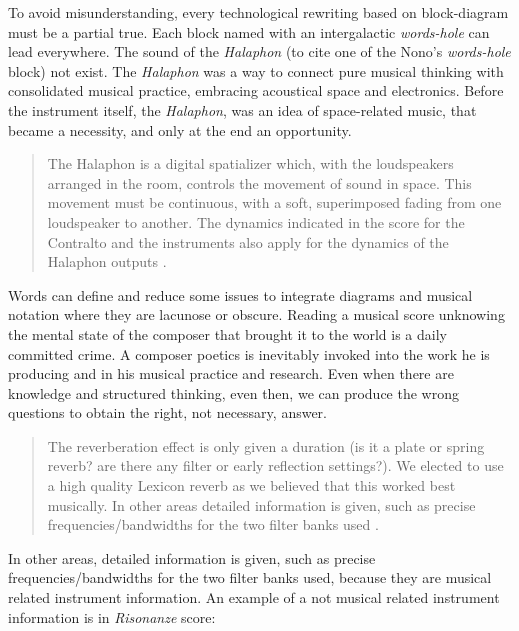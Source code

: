 \documentclass[twoside,a4paper]{article}
\begin{document}
To avoid misunderstanding, every technological rewriting based on block-diagram must be a partial true. Each block named with an intergalactic \emph{words-hole} can lead everywhere. The sound of the \emph{Halaphon} (to cite one of the Nono's \emph{words-hole} block) not exist. The \emph{Halaphon} was a way to connect pure musical thinking with consolidated musical practice, embracing acoustical space and electronics. Before the instrument itself, the \emph{Halaphon}, was an idea of space-related music, that became a necessity, and only at the end an opportunity.

\begin{quote}
The Halaphon is a digital spatializer which, with the loudspeakers arranged in the room, controls the movement of sound in space. This movement must be continuous, with a soft, superimposed fading from one loudspeaker to another. The dynamics indicated in the score for the Contralto and the instruments also apply for the dynamics of the Halaphon outputs \cite{nlre87}. %
\end{quote}

Words can define and reduce some issues to integrate diagrams and musical notation where they are lacunose or obscure. Reading a musical score unknowing the mental state of the composer that brought it to the world is a daily committed crime. A composer poetics is inevitably invoked into the work he is producing and in his musical practice and research. Even when there are knowledge and structured thinking, even then, we can produce the wrong questions to obtain the right, not necessary, answer.  

\begin{quote}
The reverberation effect is only given a duration (is it a plate or spring reverb? are there any filter or early reflection settings?). We elected to use a high quality Lexicon reverb as we believed that this worked best musically. In other areas detailed information is given, such as precise frequencies/bandwidths for the two filter banks used \cite{rw05}.
\end{quote}

In other areas, detailed information is given, such as precise frequencies/bandwidths for the two filter banks used, because they are musical related instrument information. An example of a not musical related instrument information is in \emph{Risonanze} score: 
\end{document}
